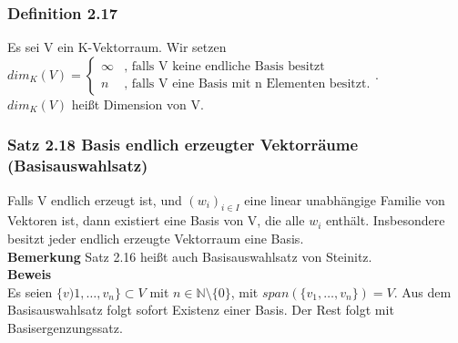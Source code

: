 \documentclass{scrartcl}
\newcommand{\N}{\mathbb{N}}
\begin{document}
\subsubsection{Definition 2.17}
Es sei V ein K-Vektorraum. Wir setzen\\
\(dim_K(V) = \begin{cases}\infty&\text{, falls V keine endliche Basis besitzt}\\n&\text{, falls V eine Basis mit n Elementen besitzt.}\end{cases}\).\\
\(dim_K(V)\) hei\ss{}t Dimension von V.

\subsubsection{Satz 2.18 Basis endlich erzeugter Vektorr\"aume (Basisauswahlsatz)}
Falls V endlich erzeugt ist, und \((w_i)_{i \in I}\) eine linear unabh\"angige Familie von Vektoren ist, dann existiert eine Basis von V, die alle \(w_i\) enth\"alt. Insbesondere besitzt jeder endlich erzeugte Vektorraum eine Basis.\\
\textbf{Bemerkung} Satz 2.16 hei\ss{}t auch Basisauswahlsatz von Steinitz.\\
\textbf{Beweis}\\
Es seien \(\{v)1, \dots, v_n\} \subset V\) mit \(n \in \N \setminus\{0\}\), mit \(span(\{v_1, \dots, v_n\}) = V\). Aus dem Basisauswahlsatz folgt sofort Existenz einer Basis. Der Rest folgt mit Basisergenzungssatz.
\end{document}
